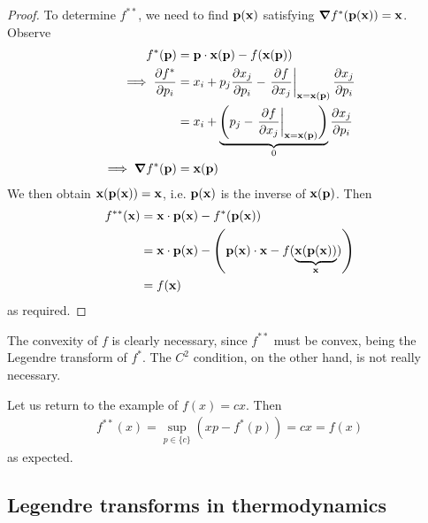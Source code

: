 \documentclass{../template/note}
\begin{document}
    \begin{proof}
        To determine $f^{**}$, we need to find $\V p(\V x)$ satisfying $\grad f^*(\V p(\V x)) = \V x$. Observe
        \begin{align*}
            f^*(\V p) &= \V p \cdot \V x(\V p) - f(\V x(\V p)) \\
            \implies \pd{f^*}{p_i} &= x_i + p_j \pd{x_j}{p_i} - \pd[\V x = \V x(\V p)]{f}{x_j} \pd{x_j}{p_i} \\
            &= x_i + \underbrace{\left(p_j - \pd[\V x = \V x(\V p)]{f}{x_j}\right)}_0 \pd{x_j}{p_i} \\
            \implies \grad f^*(\V p) &= \V x(\V p)
        \end{align*}
        We then obtain $\V x(\V p(\V x)) = \V x$, i.e. $\V p(\V x)$ is the inverse of $\V x(\V p)$. Then
        \begin{align*}
            f^{**}(\V x) &= \V x \cdot \V p(\V x) - f^*(\V p(\V x)) \\
            &= \V x \cdot \V p(\V x) - \left(\V p(\V x) \cdot \V x - f(\underbrace{\V x(\V p(\V x))}_{\V x})\right) \\
            &= f(\V x)
        \end{align*}
        as required.        
    \end{proof}
    
    \begin{remark*}
        The convexity of $f$ is clearly necessary, since $f^{**}$ must be convex, being the Legendre transform of $f^*$. The $C^2$ condition, on the other hand, is not really necessary.
    \end{remark*}
    
    \begin{example*}
        Let us return to the example of $f(x) = cx$. Then
        \begin{align*}
            f^{**}(x) = \sup_{p \in \{c\}} \left(xp-f^*(p)\right) = cx = f(x)
        \end{align*}
        as expected.
    \end{example*}
    
    \subsection{Legendre transforms in thermodynamics}
\end{document}
